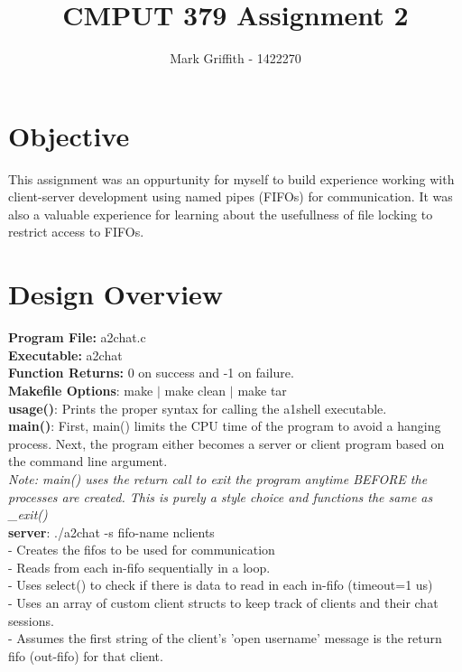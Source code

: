 \documentclass{article}
\begin{document}
\title{CMPUT 379 Assignment 2}
\author{Mark Griffith - 1422270}

\maketitle

\section{Objective}
This assignment was an oppurtunity for myself to build experience
working with client-server development using named pipes (FIFOs) for
communication. It was also a valuable experience for learning
about the usefullness of file locking to restrict access to FIFOs.

\section{Design Overview}
\textbf{Program File:} a2chat.c \\
\textbf{Executable:} a2chat \\
\textbf{Function Returns:} 0 on success and -1 on failure. \\
\textbf{Makefile Options}: make $|$ make clean $|$ make tar \\

\noindent
\textbf{usage()}: Prints the proper syntax for calling the a1shell executable. \\

\noindent
\textbf{main()}: First, main() limits the CPU time of the program to avoid a hanging
process.
Next, the program either becomes a server or client program based
on the command line argument. \\

\noindent
\textit{Note: main() uses the return call to exit the program anytime BEFORE the processes
are created. This is purely a style choice and functions the same as \_exit()} \\

\noindent
\textbf{server}: ./a2chat -s fifo-name nclients \\
- Creates the fifos to be used for communication \\
- Reads from each in-fifo sequentially in a loop. \\
- Uses select() to check if there is data to read
in each in-fifo (timeout=1 us) \\
- Uses an array of custom client structs to keep track
of clients and their chat sessions. \\
- Assumes the first string of the client's 'open username'
message is the return fifo (out-fifo) for that client. \\
\end{document}
